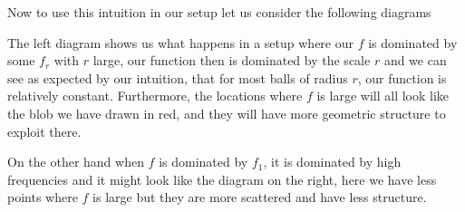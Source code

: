 \documentclass[12pt]{amsart}
\begin{document}
Now to use this intuition in our setup let us consider the following diagrams
\begin{center}

\end{center}
The left diagram shows us what happens in a setup where our $f$ is dominated by some $f_r$ with $r$ large, our function then is dominated by the scale $r$ and we can see as expected by our intuition, that for most balls of radius $r$, our function is relatively constant. Furthermore, the locations where $f$ is large will all look like the blob we have drawn in red, and they will have more geometric structure to exploit there.

On the other hand when $f$ is dominated by $f_1$, it is dominated by high frequencies and it might look like the diagram on the right, here we have less points where $f$ is large but they are more scattered and have less structure.
\end{document}
